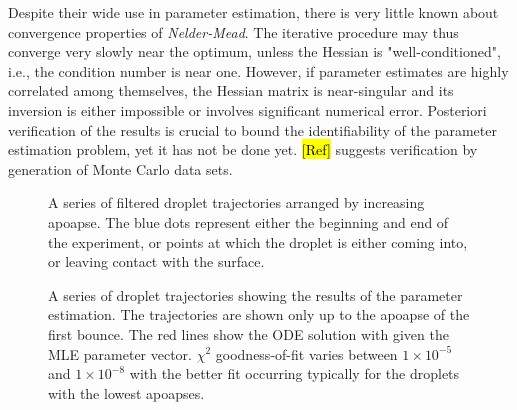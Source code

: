 \documentclass[10pt,a4paper]{article}
\begin{document}
Despite their wide use in parameter estimation, there is very little known about convergence properties of \emph{Nelder-Mead}. The iterative procedure may thus converge very slowly near the optimum, unless the Hessian is "well-conditioned", i.e., the condition number is near one. However, if parameter estimates are highly correlated among themselves, the Hessian matrix is near-singular and its inversion is either impossible or involves significant numerical error. Posteriori verification of the results is crucial to bound the identifiability of the parameter estimation problem, yet it has not be done yet. \hl{[Ref]} suggests verification by generation of Monte Carlo data sets.

\begin{figure}[h]
    \centering
    \resizebox{\textwidth}{!}{}
    \caption{A series of filtered droplet trajectories arranged by increasing apoapse. The blue dots represent either the beginning and end of the experiment, or points at which the droplet is either coming into, or leaving contact with the surface.}
    \label{fig:trajectories}
\end{figure}
\newpage
\begin{figure}[h]
    \centering
    \resizebox{\textwidth}{!}{}
    \caption{A series of droplet trajectories showing the results of the parameter estimation. The trajectories are shown only up to the apoapse of the first bounce. The red lines show the ODE solution with given the MLE parameter vector. $\chi^2$ goodness-of-fit varies between $1 \times 10^{-5}$ and $1 \times 10^{-8}$ with the better fit occurring typically for the droplets with the lowest apoapses.}
    \label{fig:inverse_problem}
\end{figure}
\end{document}
